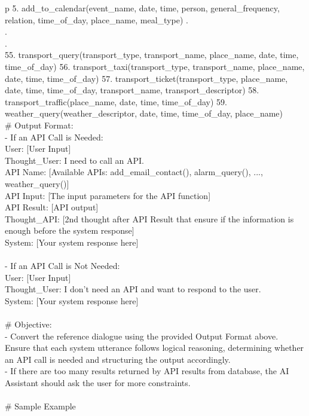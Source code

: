 \begin{table*}
\begin{tabular}{p\linewidth}
5. add\_to\_calendar(event\_name, date, time, person, general\_frequency, relation, time\_of\_day, place\_name, meal\_type)
.\\
.\\
.\\
55. transport\_query(transport\_type, transport\_name, place\_name, date, time, time\_of\_day)
56. transport\_taxi(transport\_type, transport\_name, place\_name, date, time, time\_of\_day)
57. transport\_ticket(transport\_type, place\_name, date, time, time\_of\_day, transport\_name, transport\_descriptor)
58. transport\_traffic(place\_name, date, time, time\_of\_day)
59. weather\_query(weather\_descriptor, date, time, time\_of\_day, place\_name)
 \\
\# Output Format: \\
- If an API Call is Needed: \\
\quad	User: [User Input] \\
\quad    Thought\_User: I need to call an API. \\
\quad    API Name: [Available APIs: add\_email\_contact(), alarm\_query(), ..., weather\_query()] \\
\quad    API Input: [The input parameters for the API function] \\
 \quad   API Result: [API output] \\
 \quad   Thought\_API: [2nd thought after API Result that ensure if the information is enough before the system response] \\
\quad	System: [Your system response here] \\
 \\
- If an API Call is Not Needed: \\
\quad	User: [User Input] \\
 \quad   Thought\_User: I don't need an API and want to respond to the user. \\
 \quad   System: [Your system response here] \\
 \\
\# Objective:  \\
- Convert the reference dialogue using the provided Output Format above. Ensure that each system utterance follows logical reasoning, determining whether an API call is needed and structuring the output accordingly. \\
- If there are too many results returned by API results from database, the AI Assistant should ask the user for more constraints. \\
 \\
\# Sample Example \\

\end{tabular}
\end{table*}
